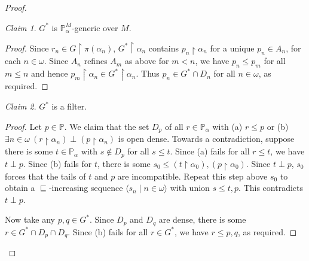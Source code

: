 \documentclass[a4paper, 11pt]{amsart}
\theoremstyle{remark}
\newtheorem*{claim*}{Claim}
\newcommand{\PP}{\mathbb{P}}
\begin{document}
\begin{proof}
\begin{claim*} 
$G^*$ is $\PP_\alpha^M$-generic over $M$. 
\end{claim*} 
\begin{proof} 
Since $r_n\in G{\upharpoonright}\pi(\alpha_n)$, $G^*{\upharpoonright}\alpha_n$ contains $p_n{\upharpoonright}\alpha_n$ for a unique $p_n\in A_n$, for each $n\in\omega$.  
Since $A_n$ refines $A_m$ as above for $m< n$, we have $p_n\leq p_m$ for all $m\leq n$ and hence $p_m{\upharpoonright}\alpha_n\in G^*{\upharpoonright}\alpha_n$. 
Thus $p_n\in G^*\cap D_n$ for all $n\in\omega$, as required. 
\end{proof} 

\begin{claim*} 
$G^*$ is a filter. 
\end{claim*} 
\begin{proof} 
Let $p\in\PP$. 
We claim that the set $D_p$ of all $r\in \PP_\alpha$ with (a) $r\leq p$ or (b) $\exists n\in\omega\ (r{\upharpoonright}\alpha_n) \perp (p{\upharpoonright}\alpha_n)$ is open dense. 
Towards a contradiction, suppose there is some $t\in \PP_\alpha$ with $s\notin D_p$ for all $s\leq t$.  
Since (a) fails for all $r\leq t$, we have $t\perp p$. 
Since (b) fails for $t$, there is some $s_0\leq (t{\upharpoonright}\alpha_0), (p{\upharpoonright}\alpha_0)$. 
Since $t\perp p$, $s_0$ forces that the tails of $t$ and $p$ are incompatible. 
Repeat this step above $s_0$ to obtain a $\sqsubseteq$-increasing sequence $\langle s_n\mid n\in\omega\rangle$ with union $s\leq t,p$. 
This contradicts $t\perp p$. 

Now take any $p,q \in G^*$. 
Since $D_p$ and $D_q$ are dense, there is some $r\in G^*\cap D_p\cap D_q$. 
Since (b) fails for all $r\in G^*$, we have $r\leq p,q$, as required. 
\end{proof} 

\end{proof} 
\end{document}
